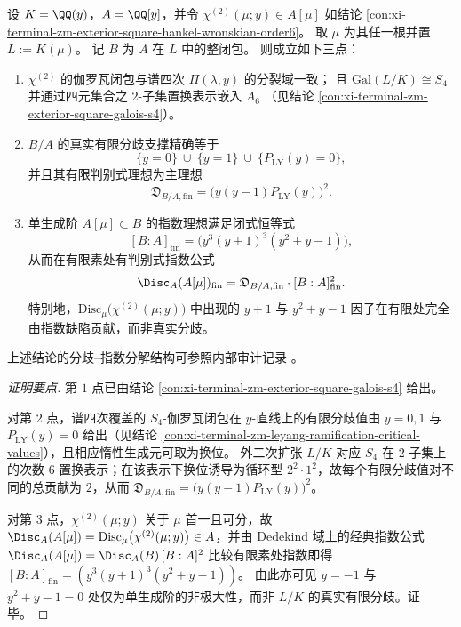 \begin{theorem}[外二次六次原始元的有限分歧精确定位与指数理想闭式公式]\label{thm:xi-terminal-zm-exterior-square-finite-ramification-index-ideal}
设 \(K=\QQ(y)\)，\(A=\QQ[y]\)，并令 \(\chi^{(2)}(\mu;y)\in A[\mu]\) 如结论 \ref{con:xi-terminal-zm-exterior-square-hankel-wronskian-order6}。
取 \(\mu\) 为其任一根并置 \(L:=K(\mu)\)。
记 \(B\) 为 \(A\) 在 \(L\) 中的整闭包。
则成立如下三点：
\begin{enumerate}
  \item \(\chi^{(2)}\) 的伽罗瓦闭包与谱四次 \(\Pi(\lambda,y)\) 的分裂域一致；
  且 \(\mathrm{Gal}(L/K)\cong S_4\) 并通过四元集合之 \(2\)-子集置换表示嵌入 \(A_6\)
  （见结论 \ref{con:xi-terminal-zm-exterior-square-galois-s4}）。
  \item \(B/A\) 的真实有限分歧支撑精确等于
  \[
  \{y=0\}\ \cup\ \{y=1\}\ \cup\ \{P_{\mathrm{LY}}(y)=0\},
  \]
  并且其有限判别式理想为主理想
  \[
  \mathfrak D_{B/A,\mathrm{fin}}=\bigl(y(y-1)P_{\mathrm{LY}}(y)\bigr)^2.
  \]
  \item 单生成阶 \(A[\mu]\subset B\) 的指数理想满足闭式恒等式
  \[
  [B:A]_{\mathrm{fin}}=\bigl(y^3(y+1)^3(y^2+y-1)\bigr),
  \]
  从而在有限素处有判别式指数公式
  \[
  \Disc_A(A[\mu])_{\mathrm{fin}}
  =\mathfrak D_{B/A,\mathrm{fin}}\cdot [B:A]_{\mathrm{fin}}^{2}.
  \]
  特别地，\(\mathrm{Disc}_{\mu}\bigl(\chi^{(2)}(\mu;y)\bigr)\) 中出现的 \(y+1\) 与 \(y^2+y-1\) 因子在有限处完全由指数缺陷贡献，而非真实分歧。
\end{enumerate}
上述结论的分歧--指数分解结构可参照内部审计记录 \cite{Internal2026ExteriorSquareFiniteRamificationIndexIdealAudit}。
\end{theorem}
\begin{proof}[证明要点]
第 \(1\) 点已由结论 \ref{con:xi-terminal-zm-exterior-square-galois-s4} 给出。
\par
对第 \(2\) 点，谱四次覆盖的 \(S_4\)-伽罗瓦闭包在 \(y\)-直线上的有限分歧值由 \(y=0,1\) 与 \(P_{\mathrm{LY}}(y)=0\) 给出（见结论 \ref{con:xi-terminal-zm-leyang-ramification-critical-values}），且相应惰性生成元可取为换位。
外二次扩张 \(L/K\) 对应 \(S_4\) 在 \(2\)-子集上的次数 \(6\) 置换表示；在该表示下换位诱导为循环型 \(2^2\cdot 1^2\)，故每个有限分歧值对不同的总贡献为 \(2\)，从而
\(
\mathfrak D_{B/A,\mathrm{fin}}=\bigl(y(y-1)P_{\mathrm{LY}}(y)\bigr)^2
\)。
\par
对第 \(3\) 点，\(\chi^{(2)}(\mu;y)\) 关于 \(\mu\) 首一且可分，故
\(
\Disc_A(A[\mu])=\mathrm{Disc}_{\mu}\bigl(\chi^{(2)}(\mu;y)\bigr)\in A
\)，并由 Dedekind 域上的经典指数公式
\(
\Disc_A(A[\mu])=\Disc_A(B)\,[B:A]^2
\)
比较有限素处指数即得
\(
[B:A]_{\mathrm{fin}}=(y^3(y+1)^3(y^2+y-1))
\)。
由此亦可见 \(y=-1\) 与 \(y^2+y-1=0\) 处仅为单生成阶的非极大性，而非 \(L/K\) 的真实有限分歧。证毕。
\end{proof}

